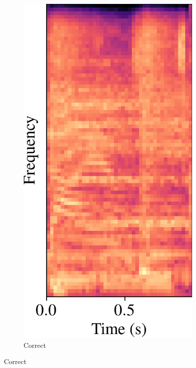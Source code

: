 \documentclass[conference]{IEEEtran}
\begin{document}
\begin{figure}[htbp]
\begin{subfigure}[b]{0.32\columnwidth}
    \end{subfigure}
    \hfill
    \begin{subfigure}[b]{0.32\columnwidth}
        \centerline{\includegraphics[width=\columnwidth]{spec_incorrect_1.png}}
        \caption{Correct}
        \label{spec_incorrect_1}

\end{subfigure}
\end{figure}
\end{document}
